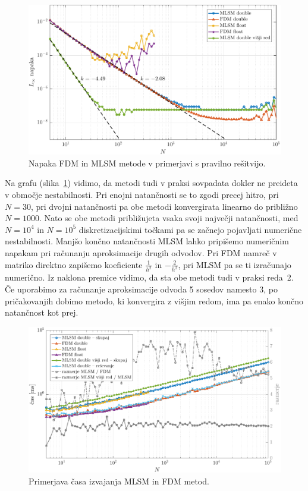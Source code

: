 \documentclass[12pt,a4paper,twoside]{article}
\theoremstyle{definition} %
\theoremstyle{plain} %
\numberwithin{equation}{section}
\newlength{\iw}
\begin{document}
\begin{figure}[h]
  \centering
  \includegraphics[width=\iw]{images/lap1d_convergence.pdf}
  \caption[Napaka FDM in MLSM metode.]{Napaka FDM in MLSM metode v primerjavi s pravilno rešitvijo.}
  \label{fig:mlsm-fdm-err}
\end{figure}

Na grafu (slika~\ref{fig:mlsm-fdm-err}) vidimo, da metodi tudi v praksi sovpadata dokler ne preideta
v območje nestabilnosti. Pri enojni natančnosti se to zgodi precej hitro, pri $N = 30$, pri dvojni
natančnosti pa obe metodi konvergirata linearno do približno $N = 1000$.  Nato se obe metodi
približujeta vsaka svoji največji natančnosti, med $N = 10^4$ in $N = 10^5$ diskretizacijskimi
točkami pa se začnejo pojavljati numerične nestabilnosti. Manjšo končno natančnosti MLSM lahko
pripišemo numeričnim napakam pri računanju aproksimacije drugih odvodov. Pri FDM namreč v matriko
direktno zapišemo koeficiente $\frac{1}{h^2}$ in $-\frac{2}{h^2}$, pri MLSM pa se ti izračunajo
numerično. Iz naklona premice vidimo, da sta obe metodi tudi v praksi reda~2. Če uporabimo za
računanje aproksimacije odvoda 5 sosedov namesto 3, po pričakovanjih dobimo metodo, ki konvergira z
višjim redom, ima pa enako končno natančnost kot prej.

\begin{figure}[h]
  \centering
  \includegraphics[width=\iw]{images/lap1d_times.pdf}
  \caption{Primerjava časa izvajanja MLSM in FDM metod.}
  \label{fig:mlsm-fdm-time}
\end{figure}
\end{document}
